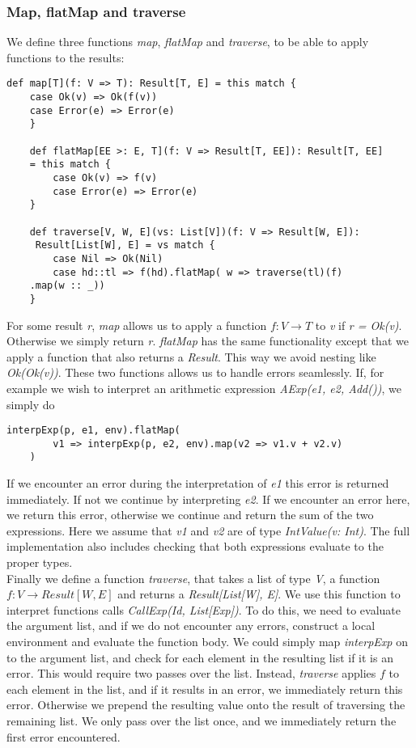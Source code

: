 \subsubsection{Map, flatMap and traverse}

We define three functions \textsl{map}, \textsl{flatMap} and \textsl{traverse}, to be able to apply functions to the results:

\begin{lstlisting}[style=simple]
	def map[T](f: V => T): Result[T, E] = this match {
	case Ok(v) => Ok(f(v))
	case Error(e) => Error(e)
	}
	
	def flatMap[EE >: E, T](f: V => Result[T, EE]): Result[T, EE] 
	= this match {
		case Ok(v) => f(v)
		case Error(e) => Error(e)
	}
	
	def traverse[V, W, E](vs: List[V])(f: V => Result[W, E]):
	 Result[List[W], E] = vs match {
		case Nil => Ok(Nil)
		case hd::tl => f(hd).flatMap( w => traverse(tl)(f)
	.map(w :: _))
	}
\end{lstlisting}
For some result \textsl{r}, \textsl{map} allows us to apply a function $f: V \rightarrow T$ to \textsl{v} if \textsl{r = Ok(v)}. Otherwise we simply return \textsl{r}. \textsl{flatMap} has the same functionality except that we apply a function that also returns a \textsl{Result}. This way we avoid nesting like \textsl{Ok(Ok(v))}. These two functions allows us to handle errors seamlessly. If, for example we wish to interpret an arithmetic expression \textsl{AExp(e1, e2, Add())}, we simply do
\newpage 

\begin{lstlisting}[style=simple]
	interpExp(p, e1, env).flatMap(
		v1 => interpExp(p, e2, env).map(v2 => v1.v + v2.v)
	)
\end{lstlisting}
If we encounter an error during the interpretation of \textsl{e1} this error is returned immediately. If not we continue by interpreting \textsl{e2}. If we encounter an error here, we return this error, otherwise we continue and return the sum of the two expressions. Here we assume that \textsl{v1} and \textsl{v2} are of type \textsl{IntValue(v: Int)}. The full implementation also includes checking that both expressions evaluate to the proper types.
\\
Finally we define a function \textsl{traverse}, that takes a list of type \textsl{V}, a function $f: V \rightarrow Result[W, E]$ and returns a \textsl{Result[List[W], E]}. We use this function to interpret functions calls \textsl{CallExp(Id, List[Exp])}. To do this, we need to evaluate the argument list, and if we do not encounter any errors, construct a local environment and evaluate the function body. We could simply map \textsl{interpExp} on to the argument list, and check for each element in the resulting list if it is an error. This would require two passes over the list. Instead, \textsl{traverse} applies $f$ to each element in the list, and if it results in an error, we immediately return this error. Otherwise we prepend the resulting value onto the result of traversing the remaining list. We only pass over the list once, and we immediately return the first error encountered.
